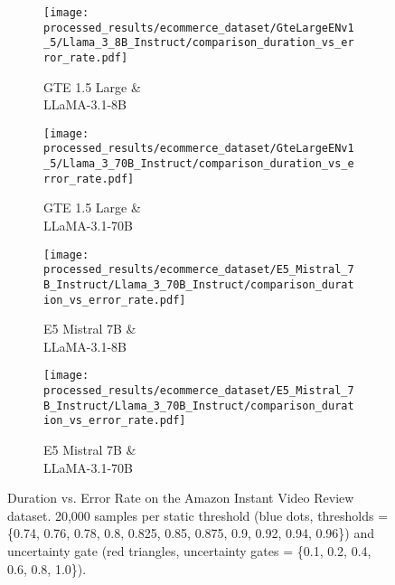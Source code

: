 \begin{figure*}[t]
    \centering
    \begin{subfigure}[b]{0.24\textwidth}
        \centering
        \texttt{[image: processed\_results/ecommerce\_dataset/GteLargeENv1\_5/Llama\_3\_8B\_Instruct/comparison\_duration\_vs\_error\_rate.pdf]}
        \caption{GTE 1.5 Large \& \\ LLaMA-3.1-8B}
        \label{fig:pdf1}
    \end{subfigure}\hfill
    \begin{subfigure}[b]{0.24\textwidth}
        \centering
        \texttt{[image: processed\_results/ecommerce\_dataset/GteLargeENv1\_5/Llama\_3\_70B\_Instruct/comparison\_duration\_vs\_error\_rate.pdf]}
        \caption{GTE 1.5 Large \& \\ LLaMA-3.1-70B}
        \label{fig:pdf2}
    \end{subfigure}\hfill
    \begin{subfigure}[b]{0.24\textwidth}
        \centering
        \texttt{[image: processed\_results/ecommerce\_dataset/E5\_Mistral\_7B\_Instruct/Llama\_3\_70B\_Instruct/comparison\_duration\_vs\_error\_rate.pdf]}
        \caption{E5 Mistral 7B \& \\ LLaMA-3.1-8B}
        \label{fig:pdf3}
    \end{subfigure}
    \begin{subfigure}[b]{0.24\textwidth}
        \centering
        \texttt{[image: processed\_results/ecommerce\_dataset/E5\_Mistral\_7B\_Instruct/Llama\_3\_70B\_Instruct/comparison\_duration\_vs\_error\_rate.pdf]}
        \caption{E5 Mistral 7B \& \\ LLaMA-3.1-70B}
        \label{fig:pdf3}
    \end{subfigure}
    \caption{Duration vs. Error Rate on the Amazon Instant Video Review dataset. 20,000 samples per static threshold (blue dots, thresholds = \{0.74, 0.76, 0.78, 0.8, 0.825, 0.85, 0.875, 0.9, 0.92, 0.94, 0.96\}) and uncertainty gate (red triangles, uncertainty gates = \{0.1, 0.2, 0.4, 0.6, 0.8, 1.0\}).}
    \label{fig:latency-vs-error-rate}
\end{figure*}

